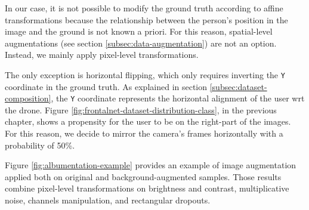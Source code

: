 \medskip

In our case, it is not possible to modify the ground truth according to affine transformations because the relationship between the person's position in the image and the ground is not known a priori. For this reason, spatial-level augmentations (see section \ref{subsec:data-augmentation}) are not an option. Instead, we mainly apply pixel-level transformations.

The only exception is horizontal flipping, which only requires inverting the \texttt{Y} coordinate in the ground truth. As explained in section \ref{subsec:dataset-composition}, the \texttt{Y} coordinate represents the horizontal alignment of the user \gls{wrt} the drone. Figure \ref{fig:frontalnet-dataset-distribution-class}, in the previous chapter, shows a propensity for the user to be on the right-part of the images. For this reason, we decide to mirror the camera's frames horizontally with a probability of 50\%.

Figure \ref{fig:albumentation-example} provides an example of image augmentation applied both on original and background-augmented samples. Those results combine pixel-level transformations on brightness and contrast, multiplicative noise, channels manipulation, and rectangular dropouts.


